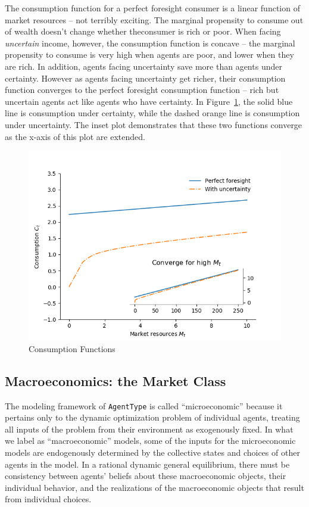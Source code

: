 \documentclass[10pt,twocolumn]{article}
\begin{document}
The consumption function for a perfect foresight consumer is a linear
function of market resources -- not terribly exciting. The marginal
propensity to consume out of wealth doesn't change whether theconsumer
is rich or poor. When facing \emph{uncertain} income, however, the
consumption function is concave -- the marginal propensity to consume is
very high when agents are poor, and lower when they are rich. In
addition, agents facing uncertainty save more than agents under
certainty. However as agents facing uncertainty get richer, their
consumption function converges to the perfect foresight consumption
function -- rich but uncertain agents act like agents who have
certainty. In \mbox{Figure \ref{fig:consumption-functions}}, the solid
blue line is consumption under certainty, while the dashed orange line
is consumption under uncertainty. The inset plot demonstrates that these
two functions converge as the x-axis of this plot are extended.

\begin{figure}
\centering
\includegraphics{./consumption_functions.png}
\caption{Consumption Functions\label{fig:consumption-functions}}
\end{figure}

\subsection{Macroeconomics: the Market
Class}\label{macroeconomics-the-market-class}

The modeling framework of \texttt{AgentType} is called ``microeconomic''
because it pertains only to the dynamic optimization problem of
individual agents, treating all inputs of the problem from their
environment as exogenously fixed. In what we label as ``macroeconomic''
models, some of the inputs for the microeconomic models are endogenously
determined by the collective states and choices of other agents in the
model. In a rational dynamic general equilibrium, there must be
consistency between agents' beliefs about these macroeconomic objects,
their individual behavior, and the realizations of the macroeconomic
objects that result from individual choices.
\end{document}
